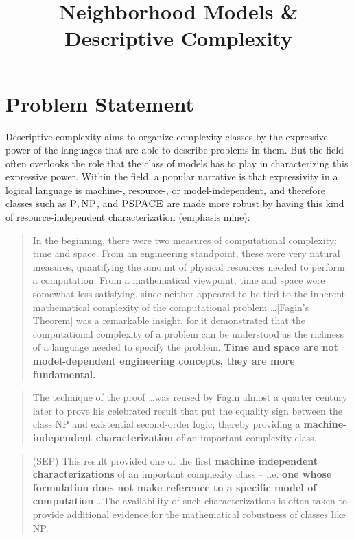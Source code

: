 \documentclass[letterpaper]{article}
\title{Neighborhood Models \& Descriptive Complexity}
\begin{document}
\maketitle

\section*{Problem Statement}
Descriptive complexity aims to organize complexity classes by the expressive power of the languages that are able to describe problems in them.  But the field often overlooks the role that the class of models has to play in characterizing this expressive power.  Within the field, a popular narrative is that expressivity in a logical language is machine-, resource-, or model-independent, and therefore classes such as $\mbox{\sc P}, \mbox{\sc NP}$, and $\mbox{\sc PSPACE}$ are made more robust by having this kind of resource-independent characterization (emphasis mine):

\begin{quote}{}
    In the beginning, there were two measures of computational complexity: time and space. From an engineering standpoint, these were very natural measures, quantifying the amount of physical resources needed to perform a computation. From a mathematical viewpoint, time and space were somewhat less satisfying, since neither appeared to be tied to the inherent mathematical complexity of the computational problem \ldots [Fagin's Theorem] was a remarkable insight, for it demonstrated that the computational complexity of a problem can be understood as the richness of a language needed to specify the problem. \textbf{Time and space are not model-dependent engineering concepts, they are more fundamental.}
\end{quote}

\begin{quote}{}
    The technique of the proof \ldots was reused by Fagin almost a quarter century later to prove his celebrated result that put the equality sign between the class NP and existential second-order logic, thereby providing a \textbf{machine-independent characterization} of an important complexity class.
\end{quote}


\begin{quote}{ (SEP)}
    This result provided one of the first \textbf{machine independent characterizations} of an important complexity class – i.e. \textbf{one whose formulation does not make reference to a specific model of computation} \ldots The availability of such characterizations is often taken to provide additional evidence for the mathematical robustness of classes like NP.
\end{quote}
\end{document}
